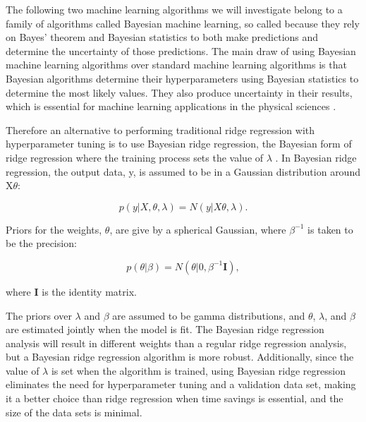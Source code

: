 The following two machine learning algorithms we will investigate belong to a family of algorithms called Bayesian machine learning, so called because they rely on Bayes' theorem and Bayesian statistics to both make predictions and determine the uncertainty of those predictions.  The main draw of using Bayesian machine learning algorithms over standard machine learning algorithms is that Bayesian algorithms determine their hyperparameters using Bayesian statistics to determine the most likely values.  They also produce uncertainty in their results, which is essential for machine learning applications in the physical sciences \cite{Ref11, Ref12, Ref169}.

Therefore an alternative to performing traditional ridge regression with hyperparameter tuning is to use Bayesian ridge regression, the Bayesian form of ridge regression where the training process sets the value of $\lambda$ \cite{Ref11, Ref12, Ref170, Ref171}. In Bayesian ridge regression, the output data, y, is assumed to be in a Gaussian distribution around X$\theta$:

\begin{equation}
    p(y|X,\theta,\lambda) = N(y | X\theta, \lambda).
\end{equation}

Priors for the weights, $\theta$, are give by a spherical Gaussian, where $\beta^{-1}$ is taken to be the precision:

\begin{equation}
    p(\theta | \beta) = N(\theta | 0, \beta^{-1}\textbf{I}),
\end{equation}

where \textbf{I} is the identity matrix.

The priors over $\lambda$ and $\beta$ are assumed to be gamma distributions, and $\theta$, $\lambda$, and $\beta$ are estimated jointly when the model is fit. The Bayesian ridge regression analysis will result in different weights than a regular ridge regression analysis, but a Bayesian ridge regression algorithm is more robust. Additionally, since the value of $\lambda$ is set when the algorithm is trained, using Bayesian ridge regression eliminates the need for hyperparameter tuning and a validation data set, making it a better choice than ridge regression when time savings is essential, and the size of the data sets is minimal.